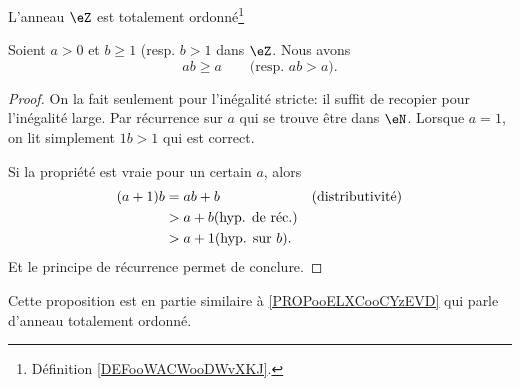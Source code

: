 
\begin{proposition}	\label{PROPooADGIooTioqdu}
	L'anneau \( \eZ\) est totalement ordonné\footnote{Définition \ref{DEFooWACWooDWvXKJ}.}
\end{proposition}

\begin{lemma}       \label{LEMooSVDDooWsyxNP}
	Soient \( a>0\) et \( b \geq 1\) (resp. \( b > 1 \) dans \( \eZ\). Nous avons
	\begin{equation}
		ab \geq a \qquad \text{(resp. }ab>a\text{)}.
	\end{equation}
\end{lemma}

\begin{proof}
	On la fait seulement pour l'inégalité stricte: il suffit de recopier pour l'inégalité large. Par récurrence sur \( a \) qui se trouve être dans \( \eN \). Lorsque \( a = 1 \), on lit simplement \( 1b > 1 \) qui est correct.

	Si la propriété est vraie pour un certain \( a \), alors
	\begin{align}
		(a+1) b & = ab + b                          &  & \text{(distributivité)} \\
		        & > a + b\text{(hyp. de réc.)}                                   \\
		        & > a + 1\text{(hyp. sur \( b \)).}
	\end{align}
	Et le principe de récurrence permet de conclure.
\end{proof}

\begin{normaltext}	\label{NORMooLienRelatifsAnnTotOrdonne}
	Cette proposition est en partie similaire à \ref{PROPooELXCooCYzEVD} qui parle d'anneau totalement ordonné.
\end{normaltext}

